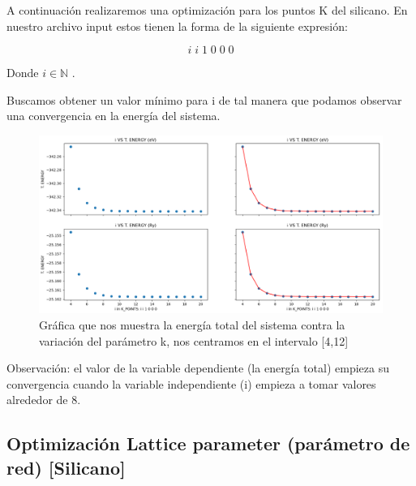 \vspace{0.5cm}

A continuación realizaremos una optimización para los puntos K del silicano. En nuestro archivo input estos
tienen la forma de la siguiente expresión: 

\begin{equation*}
    i \; i \; 1 \; 0 \; 0 \; 0
\end{equation*}

Donde $ i \in \mathbb{N}  $ .

\vspace{0.5cm}

Buscamos obtener un valor mínimo para i de tal manera que podamos observar una convergencia en la 
energía del sistema.

\begin{figure}[H]
    \centering
    \includegraphics[scale=0.33]{images_silicano/K_points_vs_Energy.png}
    \caption{Gráfica que nos muestra la energía total del sistema contra la variación del parámetro k, nos centramos en el intervalo [4,12]}
\end{figure}

\vspace{0.5cm}

Observación: el valor de la variable dependiente (la energía total) empieza su convergencia cuando 
la variable independiente (i) empieza a tomar valores alrededor de 8.




\newpage

\subsection{Optimización Lattice parameter (parámetro de red) [Silicano]}

